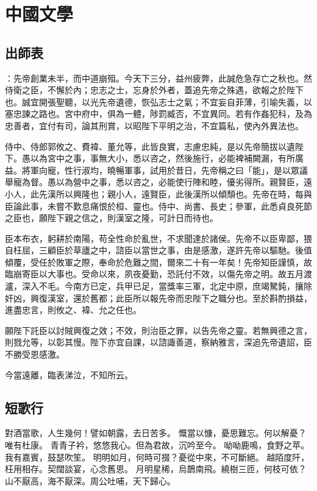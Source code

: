 
\chapter{中國文學}

\section{出師表}

：先帝創業未半，而中道崩殂。今天下三分，益州疲弊，此誠危急存亡之秋也。然侍衛之臣，不懈於內；忠志之士，忘身於外者，蓋追先帝之殊遇，欲報之於陛下也。誠宜開張聖聽，以光先帝遺德，恢弘志士之氣；不宜妄自菲薄，引喻失義，以塞忠諫之路也。宮中府中，俱為一體，陟罰臧否，不宜異同。若有作姦犯科，及為忠善者，宜付有司，論其刑賞，以昭陛下平明之治，不宜篇私，使內外異法也。\par

侍中、侍郎郭攸之、費褘、董允等，此皆良實，志慮忠純，是以先帝簡拔以遺陛下。愚以為宮中之事，事無大小，悉以咨之，然後施行，必能裨補闕漏，有所廣益。將軍向寵，性行淑均，曉暢軍事，試用於昔日，先帝稱之曰「能」，是以眾議舉寵為督。愚以為營中之事，悉以咨之，必能使行陣和睦，優劣得所。親賢臣，遠小人，此先漢所以興隆也；親小人，遠賢臣，此後漢所以傾頹也。先帝在時，每與臣論此事，未嘗不歎息痛恨於桓、靈也。侍中、尚書、長史；參軍，此悉貞良死節之臣也，願陛下親之信之，則漢室之隆，可計日而待也。

臣本布衣，躬耕於南陽，苟全性命於亂世，不求聞達於諸侯。先帝不以臣卑鄙，猥自枉屈，三顧臣於草廬之中，諮臣以當世之事，由是感激，遂許先帝以驅馳。後值傾覆，受任於敗軍之際，奉命於危難之間，爾來二十有一年矣！先帝知臣謹慎，故臨崩寄臣以大事也。受命以來，夙夜憂勤，恐託付不效，以傷先帝之明。故五月渡瀘，深入不毛。今南方已定，兵甲已足，當獎率三軍，北定中原，庶竭駑鈍，攘除奸凶，興復漢室，還於舊都；此臣所以報先帝而忠陛下之職分也。至於斟酌損益，進盡忠言，則攸之、褘、允之任也。

願陛下託臣以討賊興復之效；不效，則治臣之罪，以告先帝之靈。若無興德之言，則戮允等，以彰其慢。陛下亦宜自課，以諮諏善道，察納雅言，深追先帝遺詔，臣不勝受恩感激。

今當遠離，臨表涕泣，不知所云。

\section{短歌行\label{sec:1}}

對酒當歌，人生幾何！譬如朝露，去日苦多。
慨當以慷，憂思難忘。何以解憂？唯有杜康。
青青子衿，悠悠我心。但為君故，沉吟至今。
呦呦鹿鳴，食野之苹。我有嘉賓，鼓瑟吹笙。
明明如月，何時可掇？憂從中來，不可斷絕。
越陌度阡，枉用相存。契闊談宴，心念舊恩。
月明星稀，烏鵲南飛。繞樹三匝，何枝可依？
山不厭高，海不厭深。周公吐哺，天下歸心。

